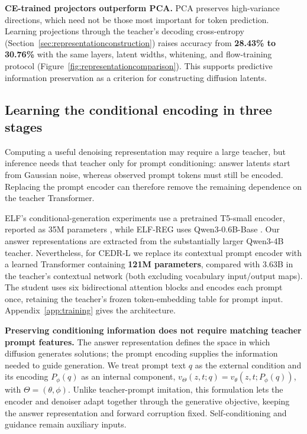 \documentclass[11pt,letterpaper]{article}
\begin{document}
\textbf{CE-trained projectors outperform PCA.}
PCA preserves high-variance directions, which need not be those most important for token prediction. Learning projections through the teacher's decoding cross-entropy (Section~\ref{sec:representationconstruction}) raises accuracy from \textbf{28.43\% to 30.76\%} with the same layers, latent widths, whitening, and flow-training protocol (Figure~\ref{fig:representationcomparison}). This supports predictive information preservation as a criterion for constructing diffusion latents.

\subsection{Learning the conditional encoding in three stages}
\label{sec:conditionalencoding}

Computing a useful denoising representation may require a large teacher, but inference needs that teacher only for prompt conditioning: answer latents start from Gaussian noise, whereas observed prompt tokens must still be encoded. Replacing the prompt encoder can therefore remove the remaining dependence on the teacher Transformer.

ELF's conditional-generation experiments use a pretrained T5-small encoder, reported as 35M parameters \citep{elf}, while ELF-REG uses Qwen3-0.6B-Base \citep{scalingdlm}. Our answer representations are extracted from the substantially larger Qwen3-4B teacher. Nevertheless, for CEDR-L we replace its contextual prompt encoder with a learned Transformer containing \textbf{121M parameters}, compared with 3.63B in the teacher's contextual network (both excluding vocabulary input/output maps). The student uses six bidirectional attention blocks and encodes each prompt once, retaining the teacher's frozen token-embedding table for prompt input. Appendix~\ref{app:training} gives the architecture.


\textbf{Preserving conditioning information does not require matching teacher prompt features.}
The answer representation defines the space in which diffusion generates solutions; the prompt encoding supplies the information needed to guide generation. We treat prompt text $q$ as the external condition and its encoding $P_\phi(q)$ as an internal component, $v_\Theta(z,t;q)=v_\theta(z,t;P_\phi(q))$, with $\Theta=(\theta,\phi)$. Unlike teacher-prompt imitation, this formulation lets the encoder and denoiser adapt together through the generative objective, keeping the answer representation and forward corruption fixed. Self-conditioning and guidance remain auxiliary inputs.
\end{document}
